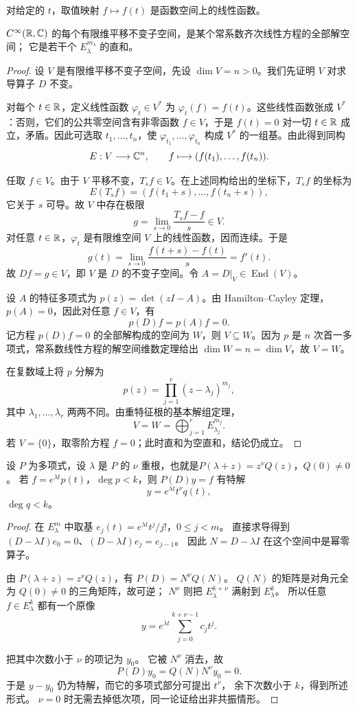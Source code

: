对给定的 $t$，取值映射 $f\mapsto f(t)$ 是函数空间上的线性函数。


\begin{theorem}\label{thm:arnold-translation}
$C^\infty(\mathbb{R},\mathbb{C})$ 的每个有限维平移不变子空间，是某个常系数齐次线性方程的全部解空间；
它是若干个 $E_\lambda^{m_\lambda}$ 的直和。
\end{theorem}
\begin{proof}
设 $V$ 是有限维平移不变子空间，先设 $\dim V=n>0$。我们先证明 $V$ 对求导算子 $D$ 不变。

对每个 $t\in\mathbb{R}$，定义线性函数 $\varphi_t\in V^*$ 为 $\varphi_t(f)=f(t)$。这些线性函数张成 $V^*$：否则，它们的公共零空间含有非零函数 $f\in V$，于是 $f(t)=0$ 对一切 $t\in\mathbb{R}$ 成立，矛盾。因此可选取 $t_1,\ldots,t_n$，使 $\varphi_{t_1},\ldots,\varphi_{t_n}$ 构成 $V^*$ 的一组基。由此得到同构
\[
 E:V\longrightarrow\mathbb{C}^n,\qquad f\longmapsto(f(t_1),\ldots,f(t_n)).
\]

任取 $f\in V$。由于 $V$ 平移不变，$T_sf\in V$。在上述同构给出的坐标下，$T_sf$ 的坐标为
\[
 E(T_sf)=(f(t_1+s),\ldots,f(t_n+s)),
\]
它关于 $s$ 可导。故 $V$ 中存在极限
\[
 g=\lim_{s\to0}\frac{T_sf-f}{s}\in V.
\]
对任意 $t\in\mathbb{R}$，$\varphi_t$ 是有限维空间 $V$ 上的线性函数，因而连续。于是
\[
 g(t)=\lim_{s\to0}\frac{f(t+s)-f(t)}s=f'(t).
\]
故 $Df=g\in V$，即 $V$ 是 $D$ 的不变子空间。令 $A=D|_V\in\operatorname{End}(V)$。

设 $A$ 的特征多项式为 $p(z)=\det(zI-A)$。由 Hamilton--Cayley 定理，$p(A)=0$，因此对任意 $f\in V$，有
\[
 p(D)f=p(A)f=0.
\]
记方程 $p(D)f=0$ 的全部解构成的空间为 $W$，则 $V\subseteq W$。因为 $p$ 是 $n$ 次首一多项式，常系数线性方程的解空间维数定理给出 $\dim W=n=\dim V$，故 $V=W$。

在复数域上将 $p$ 分解为
\[
 p(z)=\prod_{j=1}^{r}(z-\lambda_j)^{m_j},
\]
其中 $\lambda_1,\ldots,\lambda_r$ 两两不同。由重特征根的基本解组定理，
\[
 V=W=\bigoplus_{j=1}^{r}E_{\lambda_j}^{m_j}.
\]
若 $V=\{0\}$，取零阶方程 $f=0$；此时直和为空直和，结论仍成立。
\end{proof}

\begin{proposition}[非齐次项与共振]
设 $P$ 为多项式，设 \(\lambda\) 是 \(P\) 的 \(\nu\) 重根，也就是$P(\lambda+z)=z^\nu Q(z)$，$Q(0)\ne0$。
若 $f=e^{\lambda t}p(t)$，$\deg p<k$，则 $P(D)y=f$ 有特解
\[
 y=e^{\lambda t}t^\nu q(t),
\]
$\deg q<k$。
\end{proposition}
\begin{proof}
在 $E_\lambda^m$ 中取基 $e_j(t)=e^{\lambda t}t^j/j!$，$0\leq j<m$。
直接求导得到 $(D-\lambda I)e_0=0$、$(D-\lambda I)e_j=e_{j-1}$。
因此 $N=D-\lambda I$ 在这个空间中是幂零算子。

由 $P(\lambda+z)=z^\nu Q(z)$，有 $P(D)=N^\nu Q(N)$。
$Q(N)$ 的矩阵是对角元全为 $Q(0)\ne0$ 的三角矩阵，故可逆；
$N^\nu$ 则把 $E_\lambda^{k+\nu}$ 满射到 $E_\lambda^k$。
所以任意 $f\in E_\lambda^k$ 都有一个原像
\[
 y=e^{\lambda t}\sum_{j=0}^{k+\nu-1}c_jt^j.
\]

把其中次数小于 $\nu$ 的项记为 $y_0$。
它被 $N^\nu$ 消去，故 
\[
 P(D)y_0=Q(N)N^\nu y_0=0.
\]
于是 $y-y_0$ 仍为特解，而它的多项式部分可提出 $t^\nu$，
余下次数小于 $k$，得到所述形式。
$\nu=0$ 时无需去掉低次项，同一论证给出非共振情形。
\end{proof}

